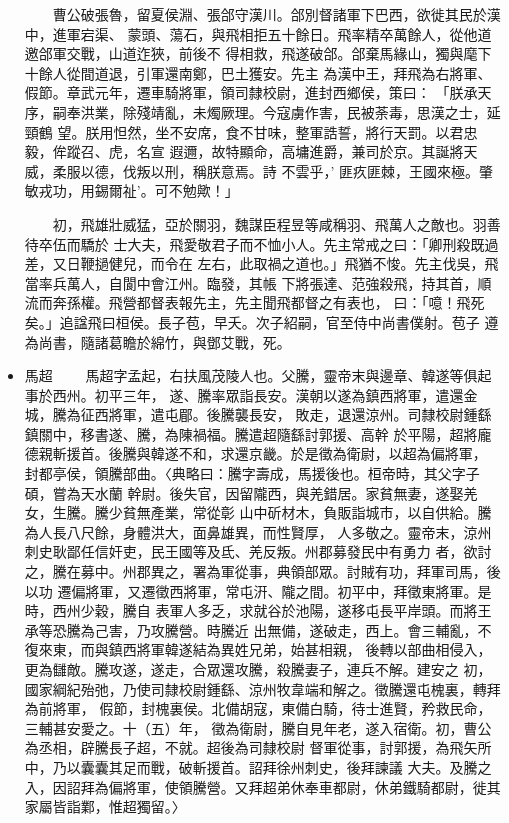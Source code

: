 \documentclass[11pt]{article}
\begin{document}
\begin{itemize}
　　曹公破張魯，留夏侯淵、張郃守漢川。郃別督諸軍下巴西，欲徙其民於漢中，進軍宕渠、
蒙頭、蕩石，與飛相拒五十餘日。飛率精卒萬餘人，從他道邀郃軍交戰，山道迮狹，前後不
得相救，飛遂破郃。郃棄馬緣山，獨與麾下十餘人從間道退，引軍還南鄭，巴土獲安。先主
為漢中王，拜飛為右將軍、假節。章武元年，遷車騎將軍，領司隸校尉，進封西鄉侯，策曰：
「朕承天序，嗣奉洪業，除殘靖亂，未燭厥理。今寇虜作害，民被荼毒，思漢之士，延頸鶴
望。朕用怛然，坐不安席，食不甘味，整軍誥誓，將行天罰。以君忠毅，侔蹤召、虎，名宣
遐邇，故特顯命，高墉進爵，兼司於京。其誕將天威，柔服以德，伐叛以刑，稱朕意焉。詩
不雲乎，' 匪疚匪棘，王國來極。肇敏戎功，用錫爾祉'。可不勉歟！」

　　初，飛雄壯威猛，亞於關羽，魏謀臣程昱等咸稱羽、飛萬人之敵也。羽善待卒伍而驕於
士大夫，飛愛敬君子而不恤小人。先主常戒之曰：「卿刑殺既過差，又日鞭撾健兒，而令在
左右，此取禍之道也。」飛猶不悛。先主伐吳，飛當率兵萬人，自閬中會江州。臨發，其帳
下將張達、范強殺飛，持其首，順流而奔孫權。飛營都督表報先主，先主聞飛都督之有表也，
曰：「噫！飛死矣。」追諡飛曰桓侯。長子苞，早夭。次子紹嗣，官至侍中尚書僕射。苞子
遵為尚書，隨諸葛瞻於綿竹，與鄧艾戰，死。

\item 馬超
\label{sec:orgheadline212}
　　馬超字孟起，右扶風茂陵人也。父騰，靈帝末與邊章、韓遂等俱起事於西州。初平三年，
遂、騰率眾詣長安。漢朝以遂為鎮西將軍，遣還金城，騰為征西將軍，遣屯郿。後騰襲長安，
敗走，退還涼州。司隸校尉鍾繇鎮關中，移書遂、騰，為陳禍福。騰遣超隨繇討郭援、高幹
於平陽，超將龐德親斬援首。後騰與韓遂不和，求還京畿。於是徵為衛尉，以超為偏將軍，
封都亭侯，領騰部曲。〈典略曰：騰字壽成，馬援後也。桓帝時，其父字子碩，嘗為天水蘭
幹尉。後失官，因留隴西，與羌錯居。家貧無妻，遂娶羌女，生騰。騰少貧無產業，常從彰
山中斫材木，負販詣城市，以自供給。騰為人長八尺餘，身體洪大，面鼻雄異，而性賢厚，
人多敬之。靈帝末，涼州刺史耿鄙任信奸吏，民王國等及氐、羌反叛。州郡募發民中有勇力
者，欲討之，騰在募中。州郡異之，署為軍從事，典領部眾。討賊有功，拜軍司馬，後以功
遷偏將軍，又遷徵西將軍，常屯汧、隴之間。初平中，拜徵東將軍。是時，西州少穀，騰自
表軍人多乏，求就谷於池陽，遂移屯長平岸頭。而將王承等恐騰為己害，乃攻騰營。時騰近
出無備，遂破走，西上。會三輔亂，不復來東，而與鎮西將軍韓遂結為異姓兄弟，始甚相親，
後轉以部曲相侵入，更為讎敵。騰攻遂，遂走，合眾還攻騰，殺騰妻子，連兵不解。建安之
初，國家綱紀殆弛，乃使司隸校尉鍾繇、涼州牧韋端和解之。徵騰還屯槐裏，轉拜為前將軍，
假節，封槐裏侯。北備胡寇，東備白騎，待士進賢，矜救民命，三輔甚安愛之。十（五）年，
徵為衛尉，騰自見年老，遂入宿衛。初，曹公為丞相，辟騰長子超，不就。超後為司隸校尉
督軍從事，討郭援，為飛矢所中，乃以囊囊其足而戰，破斬援首。詔拜徐州刺史，後拜諫議
大夫。及騰之入，因詔拜為偏將軍，使領騰營。又拜超弟休奉車都尉，休弟鐵騎都尉，徙其
家屬皆詣鄴，惟超獨留。〉


\end{itemize}
\end{document}
